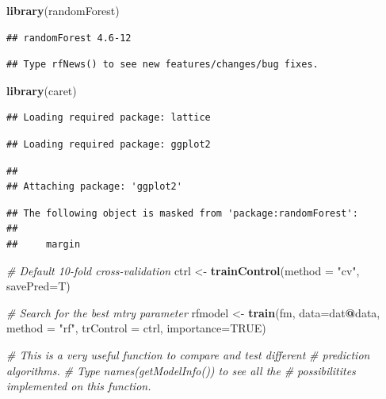 \documentclass[10pt,b5paper,]{book}
\newenvironment{Shaded}{\begin{snugshade}}{\end{snugshade}}
\newcommand{\CommentTok}[1]{\textcolor[rgb]{0.56,0.35,0.01}{\textit{#1}}}
\newcommand{\DataTypeTok}[1]{\textcolor[rgb]{0.13,0.29,0.53}{#1}}
\newcommand{\KeywordTok}[1]{\textcolor[rgb]{0.13,0.29,0.53}{\textbf{#1}}}
\newcommand{\NormalTok}[1]{#1}
\newcommand{\OperatorTok}[1]{\textcolor[rgb]{0.81,0.36,0.00}{\textbf{#1}}}
\newcommand{\OtherTok}[1]{\textcolor[rgb]{0.56,0.35,0.01}{#1}}
\newcommand{\StringTok}[1]{\textcolor[rgb]{0.31,0.60,0.02}{#1}}
\theoremstyle{definition}
\theoremstyle{definition}
\theoremstyle{definition}
\theoremstyle{remark}
\begin{document}
\begin{Shaded}
\begin{Highlighting}[]
\KeywordTok{library}\NormalTok{(randomForest)}
\end{Highlighting}
\end{Shaded}

\begin{verbatim}
## randomForest 4.6-12
\end{verbatim}

\begin{verbatim}
## Type rfNews() to see new features/changes/bug fixes.
\end{verbatim}

\begin{Shaded}
\begin{Highlighting}[]
\KeywordTok{library}\NormalTok{(caret)}
\end{Highlighting}
\end{Shaded}

\begin{verbatim}
## Loading required package: lattice
\end{verbatim}

\begin{verbatim}
## Loading required package: ggplot2
\end{verbatim}

\begin{verbatim}
## 
## Attaching package: 'ggplot2'
\end{verbatim}

\begin{verbatim}
## The following object is masked from 'package:randomForest':
## 
##     margin
\end{verbatim}

\begin{Shaded}
\begin{Highlighting}[]
\CommentTok{# Default 10-fold cross-validation}
\NormalTok{ctrl <-}\StringTok{ }\KeywordTok{trainControl}\NormalTok{(}\DataTypeTok{method =} \StringTok{"cv"}\NormalTok{, }\DataTypeTok{savePred=}\NormalTok{T)}

\CommentTok{# Search for the best mtry parameter}
\NormalTok{rfmodel <-}\StringTok{ }\KeywordTok{train}\NormalTok{(fm, }\DataTypeTok{data=}\NormalTok{dat}\OperatorTok{@}\NormalTok{data, }\DataTypeTok{method =} \StringTok{"rf"}\NormalTok{, }\DataTypeTok{trControl =}\NormalTok{ ctrl, }
             \DataTypeTok{importance=}\OtherTok{TRUE}\NormalTok{)}

\CommentTok{# This is a very useful function to compare and test different }
\CommentTok{# prediction algorithms.}
\CommentTok{# Type names(getModelInfo()) to see all the }
\CommentTok{# possibilitites implemented on this function.}
\end{Highlighting}
\end{Shaded}
\end{document}

